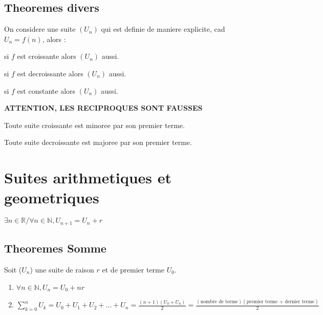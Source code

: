 \documentclass[a4paper,10pt]{book}
\begin{document}
	\subsection{Theoremes divers}
	\label{sub:Theoremes divers}

	\begin{prop}
		On considere une suite $(U_n)$ qui est definie de maniere explicite, cad $U_n = f(n)$, alors :
		\begin{description}
			\item si $f$ est croissante alors $(U_n)$ aussi.
			\item si $f$ est decroissante alors $(U_n)$ aussi.
			\item si $f$ est constante alors $(U_n)$ aussi.
		\end{description}
	\end{prop}
	\textbf{ATTENTION, LES RECIPROQUES SONT FAUSSES}

	\begin{prop}
		\begin{description}
			\item Toute suite croissante est minoree par son premier terme.
			\item Toute suite decroissante est majoree par son premier terme.
		\end{description}
	\end{prop}

	\section{Suites arithmetiques et geometriques}
	\label{sec:Suites arithmetiques et geometriques}

	$\exists n \in \mathbb{R} / \forall n \in \mathbb{N}, U_{n+1} = U_n + r$

	\subsection{Theoremes Somme}
	\label{sub:Theoremes Somme}

	\begin{prop}
		Soit ($U_n$) une suite de raison $r$ et de premier terme $U_0$.
		\begin{enumerate}
			\item $\forall n \in \mathbb{N}, U_n = U_0 + nr$
			\item $\sum_{k = 0}^{n} U_k = U_0 + U_1 + U_2 + ... + U_n = \frac{(n+1)(U_0 + U_n)}{2} = \frac{(\text{nombre de terme})(\text{premier terme + dernier terme})}{2}$
		\end{enumerate}
	\end{prop}
\end{document}
